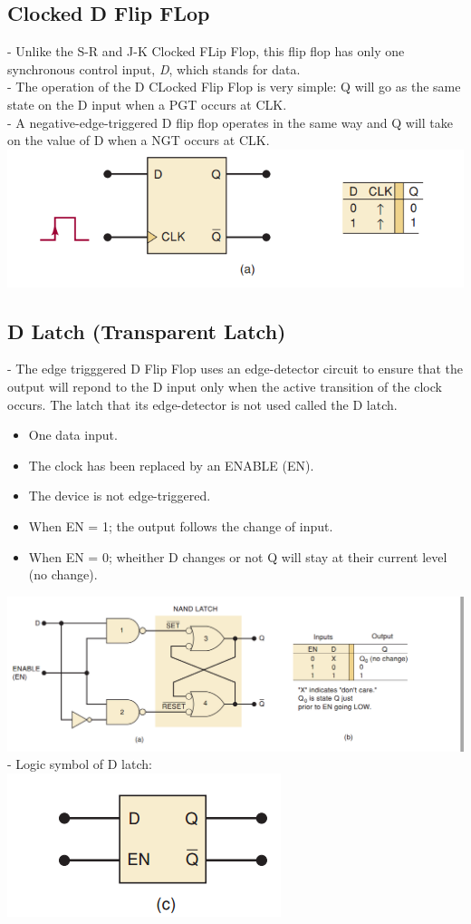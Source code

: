 \documentclass[12pt]{article}
\begin{document}
\subsection{Clocked D Flip FLop}
- Unlike the S-R and J-K Clocked FLip Flop, this flip flop has only one synchronous control input, \textit{D}, which stands for data. \\
- The operation of the D  CLocked Flip Flop is very simple: Q will go as the same state on the D input when a PGT occurs at CLK. \\
- A negative-edge-triggered D flip flop operates in the same way and Q will take on the value of D when a NGT occurs at CLK. \\
\includegraphics[scale=0.8]{hinh12}
\subsection{D Latch (Transparent Latch)}
-  The edge trigggered D Flip Flop uses an edge-detector circuit to ensure that the output will repond to the D input only when the active transition of the clock occurs. The latch that its edge-detector is not used called the D latch.
\begin{itemize}
	\item One data input.
	\item The clock has been replaced by an ENABLE (EN).
	\item The device is not edge-triggered.
	\item When EN = 1; the output follows the change of input.
	\item When EN = 0; wheither D changes or not Q will stay at their current level (no change).
\end{itemize}
\includegraphics[scale = 0.8]{hinh13}
\bigbreak
- Logic symbol of D latch: \\
\includegraphics[scale = 0.85]{hinh14}
\end{document}
